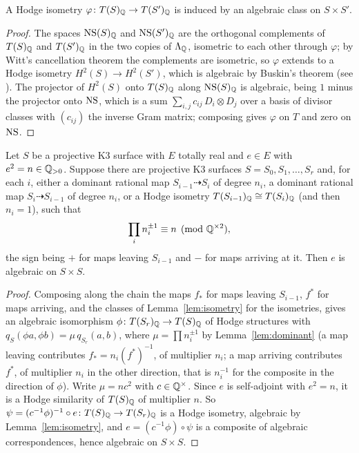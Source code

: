 \begin{lemma}\label{lem:isometry}
A Hodge isometry $\varphi\colon T(S)_{\mathbb{Q}}\to T(S')_{\mathbb{Q}}$ is induced by an algebraic class on $S\times S'$.
\end{lemma}

\begin{proof}
The spaces $\mathrm{NS}(S)_{\mathbb{Q}}$ and $\mathrm{NS}(S')_{\mathbb{Q}}$ are the orthogonal complements of $T(S)_{\mathbb{Q}}$ and $T(S')_{\mathbb{Q}}$ in the two copies of $\Lambda_{\mathbb{Q}}$, isometric to each other through $\varphi$; by Witt's cancellation theorem the complements are isometric, so $\varphi$ extends to a Hodge isometry $H^{2}(S)\to H^{2}(S')$, which is algebraic by Buskin's theorem \cite{Bus19} (see \cite[Thm.~0.1]{Huy19}). The projector of $H^{2}(S)$ onto $T(S)_{\mathbb{Q}}$ along $\mathrm{NS}(S)_{\mathbb{Q}}$ is algebraic, being $1$ minus the projector onto $\mathrm{NS}$, which is a sum $\sum_{i,j}c_{ij}\,D_{i}\otimes D_{j}$ over a basis of divisor classes with $(c_{ij})$ the inverse Gram matrix; composing gives $\varphi$ on $T$ and zero on $\mathrm{NS}$.
\end{proof}

\begin{theorem}[Chains]\label{thm:chain}
Let $S$ be a projective K3 surface with $E$ totally real and $e\in E$ with $e^{2}=n\in\mathbb{Q}_{>0}$. Suppose there are projective K3 surfaces $S=S_{0},S_{1},\dots,S_{r}$ and, for each $i$, either a dominant rational map $S_{i-1}\dashrightarrow S_{i}$ of degree $n_{i}$, a dominant rational map $S_{i}\dashrightarrow S_{i-1}$ of degree $n_{i}$, or a Hodge isometry $T(S_{i-1})_{\mathbb{Q}}\cong T(S_{i})_{\mathbb{Q}}$ (and then $n_{i}=1$), such that
\[
\prod_{i}n_{i}^{\pm1}\equiv n\pmod{\mathbb{Q}^{\times2}},
\]
the sign being $+$ for maps leaving $S_{i-1}$ and $-$ for maps arriving at it. Then $e$ is algebraic on $S\times S$.
\end{theorem}

\begin{proof}
Composing along the chain the maps $f_{*}$ for maps leaving $S_{i-1}$, $f^{*}$ for maps arriving, and the classes of Lemma~\ref{lem:isometry} for the isometries, gives an algebraic isomorphism $\phi\colon T(S_{r})_{\mathbb{Q}}\to T(S)_{\mathbb{Q}}$ of Hodge structures with $q_{S}(\phi a,\phi b)=\mu\,q_{S_{r}}(a,b)$, where $\mu=\prod n_{i}^{\pm1}$ by Lemma~\ref{lem:dominant} (a map leaving contributes $f_{*}=n_{i}(f^{*})^{-1}$, of multiplier $n_{i}$; a map arriving contributes $f^{*}$, of multiplier $n_{i}$ in the other direction, that is $n_{i}^{-1}$ for the composite in the direction of $\phi$). Write $\mu=nc^{2}$ with $c\in\mathbb{Q}^{\times}$. Since $e$ is self-adjoint with $e^{2}=n$, it is a Hodge similarity of $T(S)_{\mathbb{Q}}$ of multiplier $n$. So $\psi=(c^{-1}\phi)^{-1}\circ e\colon T(S)_{\mathbb{Q}}\to T(S_{r})_{\mathbb{Q}}$ is a Hodge isometry, algebraic by Lemma~\ref{lem:isometry}, and $e=(c^{-1}\phi)\circ\psi$ is a composite of algebraic correspondences, hence algebraic on $S\times S$.
\end{proof}

